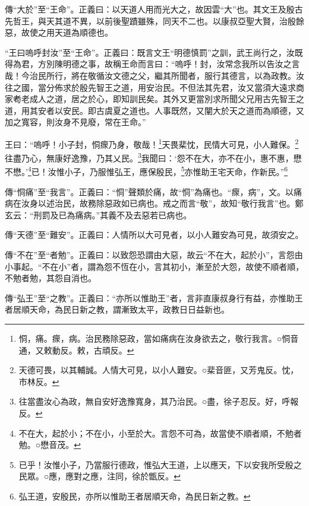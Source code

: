 {\noindent\zhuan{}\fzbyks 傳“大於”至“王命”。正義曰：以天道人用而光大之，故因雲“大”也。其文王及殷古先哲王，與天其道不異，以前後聖蹟雖殊，同天不二也。以康叔亞聖大賢，治殷餘惡，故使之用天道為順德也。 \par}

{\noindent\shu{}\fzkt “王曰嗚呼封汝”至“王命”。正義曰：既言文王“明德慎罰”之訓，武王尚行之，汝既得為君，方別陳明德之事，故稱王命而言曰：“嗚呼！封，汝常念我所以告汝之言哉！今治民所行，將在敬循汝文德之父，繼其所聞者，服行其德言，以為政教。汝往之國，當分佈求於殷先智王之道，用安治民。不但法其先君，汝又當須大遠求商家耇老成人之道，居之於心，即知訓民矣。其外又更當別求所聞父兄用古先智王之道，用其安者以安民。即古虞夏之道也。人事既然，又闡大於天之道而為順德，又加之寬容，則汝身不見廢，常在王命。” \par}

王曰：“嗚呼！小子封，恫瘝乃身，敬哉！\footnote{恫，痛。瘝，病。治民務除惡政，當如痛病在汝身欲去之，敬行我言。○恫音通，又敕動反。敕，古頑反。}天畏棐忱，民情大可見，小人難保。\footnote{天德可畏，以其輔誠。人情大可見，以小人難安。○棐音匪，又芳鬼反。忱，巿林反。}往盡乃心，無康好逸豫，乃其乂民。\footnote{往當盡汝心為政，無自安好逸豫寬身，其乃治民。○盡，徐子忍反。好，呼報反。}我聞曰：‘怨不在大，亦不在小，惠不惠，懋不懋。’\footnote{不在大，起於小；不在小，小至於大。言怨不可為，故當使不順者順，不勉者勉。○懋音茂。}已！汝惟小子，乃服惟弘王，應保殷民，\footnote{已乎！汝惟小子，乃當服行德政，惟弘大王道，上以應天，下以安我所受殷之民眾。○應，應對之應，注同，徐於甑反。}亦惟助王宅天命，作新民。”\footnote{弘王道，安殷民，亦所以惟助王者居順天命，為民日新之教。}


{\noindent\zhuan{}\fzbyks 傳“恫痛”至“我言”。正義曰：“恫”聲類於痛，故“恫”為痛也。“瘝，病”，文。以痛病在汝身以述治民，故務除惡政如已病也。戒之而言“敬”，故知“敬行我言”也。鄭玄云：“刑罰及已為痛病。”其義不及去惡若已病也。 \par}

{\noindent\zhuan{}\fzbyks 傳“天德”至“難安”。正義曰：人情所以大可見者，以小人難安為可見，故須安之。 \par}

{\noindent\zhuan{}\fzbyks 傳“不在”至“者勉”。正義曰：以致怨恐謂由大惡，故云“不在大，起於小”，言怨由小事起。“不在小”者，謂為怨不恆在小，言其初小，漸至於大怨，故使不順者順，不勉者勉，其怨自消也。 \par}

{\noindent\zhuan{}\fzbyks 傳“弘王”至“之教”。正義曰：“亦所以惟助王”者，言非直康叔身行有益，亦惟助王者居順天命，為民日新之教，謂漸致太平，政教日日益新也。 \par}

